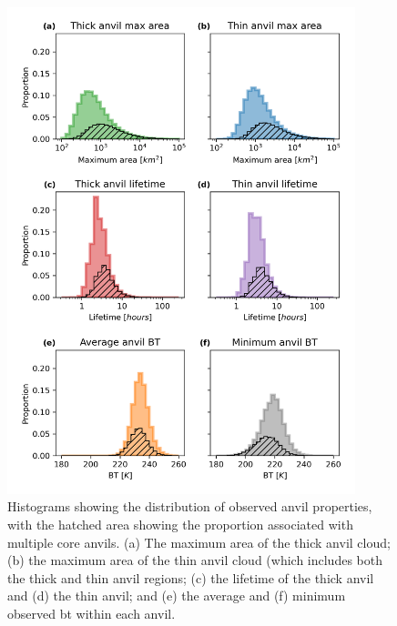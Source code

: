 

\begin{figure}[tp]
    \centering
    \includegraphics[width=0.9\textwidth]{figures/chapter2_20.png}
    \caption[
    Histograms showing the distribution of observed anvil properties
    ]{
    Histograms showing the distribution of observed anvil properties, with the hatched area showing the proportion associated with multiple core anvils. (a) The maximum area of the thick anvil cloud; (b) the maximum area of the thin anvil cloud (which includes both the thick and thin anvil regions; (c) the lifetime of the thick anvil and (d) the thin anvil; and (e) the average and (f) minimum observed \acrshort{bt} within each anvil.
    }
    \label{fig:anvil_properties}
\end{figure}

